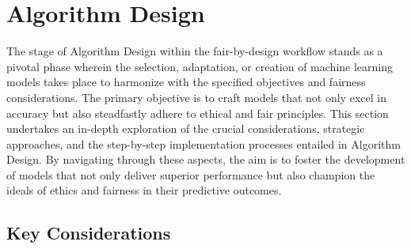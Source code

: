 \documentclass[12pt,a4paper,openright,twoside]{book}
\begin{document}
\section{Algorithm Design}
\label{section: algorithm-design}

The stage of Algorithm Design within the fair-by-design workflow stands as a pivotal phase wherein the selection, adaptation, or creation of machine learning models takes place to harmonize with the specified objectives and fairness considerations. The primary objective is to craft models that not only excel in accuracy but also steadfastly adhere to ethical and fair principles. This section undertakes an in-depth exploration of the crucial considerations, strategic approaches, and the step-by-step implementation processes entailed in Algorithm Design. By navigating through these aspects, the aim is to foster the development of models that not only deliver superior performance but also champion the ideals of ethics and fairness in their predictive outcomes.

\subsection{Key Considerations}
\end{document}
